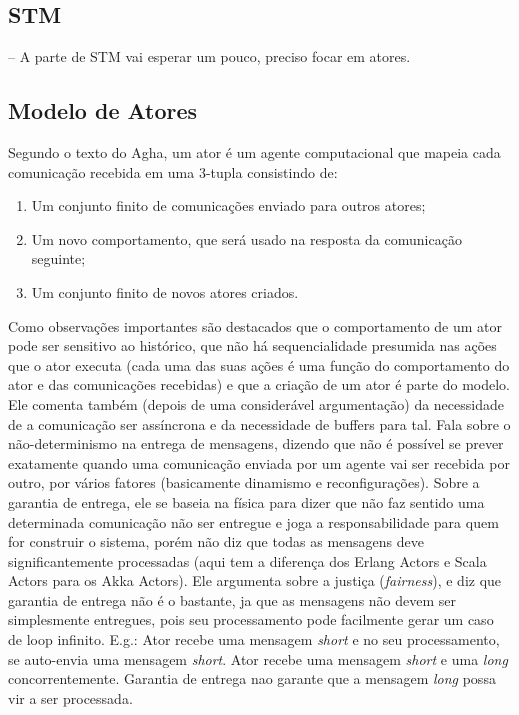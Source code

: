\documentclass[]{article}
\begin{document}
		
	\subsection{STM}
		-- A parte de STM vai esperar um pouco, preciso focar em atores.
	\subsection{Modelo de Atores}

		\par Segundo o texto do Agha, um ator é um agente computacional que mapeia cada comunicação recebida em uma
		3-tupla consistindo de:
		\begin{enumerate}
			\item Um conjunto finito de comunicações enviado para outros atores;
			\item Um novo comportamento, que será usado na resposta da comunicação seguinte;
			\item Um conjunto finito de novos atores criados.
		\end{enumerate}

		\par Como observações importantes são destacados que o comportamento de um ator pode ser sensitivo ao histórico,
		que não há sequencialidade presumida nas ações que o ator executa (cada uma das suas ações é uma função do
		comportamento do ator e das comunicações recebidas) e que a criação de um ator é parte do modelo. Ele comenta
		também (depois de uma considerável argumentação) da necessidade de a comunicação ser assíncrona e da necessidade
		de buffers para tal. Fala sobre o não-determinismo na entrega de mensagens, dizendo que não é possível se prever
		exatamente quando uma comunicação enviada por um agente vai ser recebida por outro, por vários fatores (basicamente
		dinamismo e reconfigurações). Sobre a garantia de entrega, ele se baseia na física para dizer que não faz sentido
		uma determinada comunicação não ser entregue e joga a responsabilidade para quem for construir o sistema, porém não
		diz que todas as mensagens deve significantemente processadas (aqui tem a diferença dos Erlang Actors e Scala Actors
		para os Akka Actors). Ele argumenta sobre a justiça (\textit{fairness}), e diz que garantia de entrega não
		é o bastante, ja que as mensagens não devem ser simplesmente entregues, pois seu processamento pode facilmente
		gerar um caso de loop infinito. E.g.: Ator recebe uma mensagem \emph{short} e no seu processamento, se auto-envia
		uma mensagem \emph{short}. Ator recebe uma mensagem \emph{short} e uma \emph{long} concorrentemente. Garantia
		de entrega nao garante que a mensagem \emph{long} possa vir a ser processada.\\
		
\end{document}
